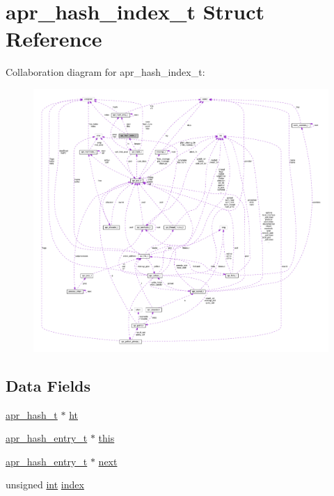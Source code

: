 \hypertarget{structapr__hash__index__t}{}\section{apr\+\_\+hash\+\_\+index\+\_\+t Struct Reference}
\label{structapr__hash__index__t}


Collaboration diagram for apr\+\_\+hash\+\_\+index\+\_\+t\+:
\nopagebreak
\begin{figure}[H]
\begin{center}
\leavevmode
\includegraphics[width=350pt]{structapr__hash__index__t__coll__graph}
\end{center}
\end{figure}
\subsection*{Data Fields}
\begin{DoxyCompactItemize}
\item 
\hyperlink{structapr__hash__t}{apr\+\_\+hash\+\_\+t} $\ast$ \hyperlink{structapr__hash__index__t_a68155ad0c66ebf1e6f52bc66c8564d02}{ht}
\item 
\hyperlink{structapr__hash__entry__t}{apr\+\_\+hash\+\_\+entry\+\_\+t} $\ast$ \hyperlink{structapr__hash__index__t_aa465bf08ed0774a74d491e06b2e60a41}{this}
\item 
\hyperlink{structapr__hash__entry__t}{apr\+\_\+hash\+\_\+entry\+\_\+t} $\ast$ \hyperlink{structapr__hash__index__t_a12df866db16de0f9b835c094e6ec9399}{next}
\item 
unsigned \hyperlink{pcre_8txt_a42dfa4ff673c82d8efe7144098fbc198}{int} \hyperlink{structapr__hash__index__t_a1e0bcc3b2fc81e31f903fe064295c6f8}{index}
\end{DoxyCompactItemize}


